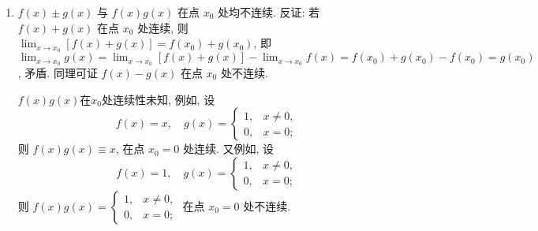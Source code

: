 \begin{solution}
    \begin{enumerate}
        \item $f(x) \pm g(x)$ 与 $f(x)g(x)$ 在点 $x_0$ 处均不连续. 反证: 若 $f(x)+g(x)$ 在点 $x_0$ 处连续, 则 $\lim_{x \to x_0} [f(x)+g(x)] = f(x_0)+g(x_0)$, 即 $\lim_{x \to x_0} g(x) = \lim_{x \to x_0} [f(x)+g(x)] - \lim_{x \to x_0} f(x) = f(x_0)+g(x_0)-f(x_0)=g(x_0)$, 矛盾. 同理可证 $f(x)-g(x)$ 在点 $x_0$ 处不连续.

              $f(x)g(x)$在$x_0$处连续性未知, 例如, 设
              $$ f(x) = x, \quad g(x) = \begin{cases} 1, & x \ne 0, \\ 0, & x=0; \end{cases} $$
                则 $f(x)g(x) \equiv x$, 在点 $x_0=0$ 处连续. 又例如, 设
                $$ f(x) = 1, \quad g(x) = \begin{cases} 1, & x \ne 0, \\ 0, & x=0; \end{cases} $$
                则 $f(x)g(x) = \begin{cases} 1, & x \ne 0, \\ 0, & x=0; \end{cases}$ 在点 $x_0=0$ 处不连续.


\end{enumerate}
\end{solution}

